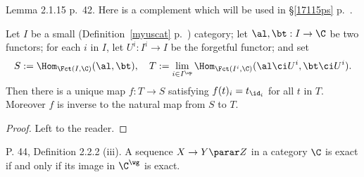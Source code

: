 \documentclass[12pt]{article}
\theoremstyle{remark}
\theoremstyle{definition}
\begin{document}
%

\begin{s}
Lemma 2.1.15 p.~42. Here is a complement which will be used in \S\ref{17115ps} p.~. 

\begin{thm}
Let $I$ be a small (Definition~\ref{myuscat} p.~) category; %
let $\al,\bt:I\to\C$ be two functors; for each $i$ in $I$, let $U^i:I^i\to I$ be the forgetful functor; and set 
$$
S:=\Hom_{\Fct(I,\C)}(\al,\bt),\quad T:=\lim_{i\in I^{\op}}\Hom_{\Fct(I^i,\C)}(\al\ci U^i,\bt\ci U^i).
$$ 
Then there is a unique map $f:T\to S$ satisfying $f(t)_i=t_{\id_i}$ for all $t$ in $T$. Moreover $f$ is inverse to the natural map from $S$ to $T$. 
\end{thm} 

\begin{proof}
Left to the reader.
\end{proof}
\end{s} 


\begin{s} 
P. 44, Definition 2.2.2 (iii). A sequence $X\to Y\parar Z$ in a category $\C$ is exact if and only if its image in $\C^\wg$ is exact.
\end{s}


\end{document}
